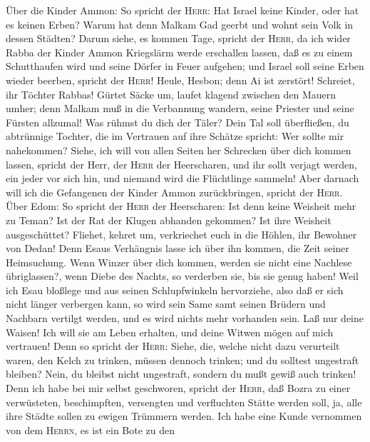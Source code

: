  Über die Kinder Ammon: So spricht der \textsc{Herr}: Hat
Israel keine Kinder, oder hat es keinen Erben? Warum hat denn Malkam Gad
geerbt und wohnt sein Volk in dessen Städten?  Darum
siehe, es kommen Tage, spricht der \textsc{Herr}, da ich wider Rabba der
Kinder Ammon Kriegslärm werde erschallen lassen, daß es zu einem
Schutthaufen wird und seine Dörfer in Feuer aufgehen; und Israel soll
seine Erben wieder beerben, spricht der \textsc{Herr}! 
Heule, Hesbon; denn Ai ist zerstört! Schreiet, ihr Töchter Rabbas!
Gürtet Säcke um, laufet klagend zwischen den Mauern umher; denn Malkam
muß in die Verbannung wandern, seine Priester und seine Fürsten
allzumal!  Was rühmst du dich der Täler? Dein Tal soll
überfließen, du abtrünnige Tochter, die im Vertrauen auf ihre Schätze
spricht: Wer sollte mir nahekommen?  Siehe, ich will von
allen Seiten her Schrecken über dich kommen lassen, spricht der Herr,
der \textsc{Herr} der Heerscharen, und ihr sollt verjagt werden, ein
jeder vor sich hin, und niemand wird die Flüchtlinge sammeln!
 Aber darnach will ich die Gefangenen der Kinder Ammon
zurückbringen, spricht der \textsc{Herr}.  Über Edom: So
spricht der \textsc{Herr} der Heerscharen: Ist denn keine Weisheit mehr
zu Teman? Ist der Rat der Klugen abhanden gekommen? Ist ihre Weisheit
ausgeschüttet?  Fliehet, kehret um, verkriechet euch in
die Höhlen, ihr Bewohner von Dedan! Denn Esaus Verhängnis lasse ich über
ihn kommen, die Zeit seiner Heimsuchung.  Wenn Winzer über
dich kommen, werden sie nicht eine Nachlese übriglassen?, wenn Diebe des
Nachts, so verderben sie, bis sie genug haben!  Weil ich
Esau bloßlege und aus seinen Schlupfwinkeln hervorziehe, also daß er
sich nicht länger verbergen kann, so wird sein Same samt seinen Brüdern
und Nachbarn vertilgt werden, und es wird nichts mehr vorhanden sein.
 Laß nur deine Waisen! Ich will sie am Leben erhalten,
und deine Witwen mögen auf mich vertrauen!  Denn so
spricht der \textsc{Herr}: Siehe, die, welche nicht dazu verurteilt
waren, den Kelch zu trinken, müssen dennoch trinken; und du solltest
ungestraft bleiben? Nein, du bleibst nicht ungestraft, sondern du mußt
gewiß auch trinken!  Denn ich habe bei mir selbst
geschworen, spricht der \textsc{Herr}, daß Bozra zu einer verwüsteten,
beschimpften, versengten und verfluchten Stätte werden soll, ja, alle
ihre Städte sollen zu ewigen Trümmern werden.  Ich habe
eine Kunde vernommen von dem \textsc{Herrn}, es ist ein Bote zu den
